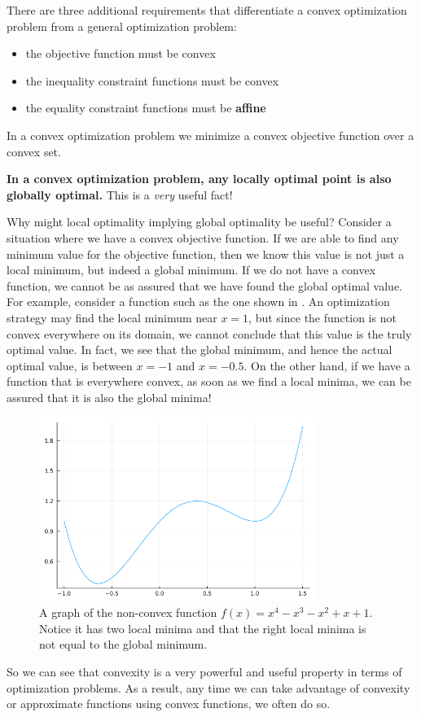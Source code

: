 There are three additional requirements that differentiate a convex optimization problem from a general optimization problem:
{\color{baystate}
	\begin{itemize}
		\item the objective function must be convex
		\item the inequality constraint functions must be convex
		\item the equality constraint functions must be {\color{tiananmen}\textbf{affine}}
	\end{itemize}
}

In a convex optimization problem we minimize a convex objective function over a convex set.

\textbf{In a convex optimization problem, any {\color{tiananmen}\textbf{locally optimal point}} is also {\color{tiananmen}\textbf{globally optimal}}.} This is a \textit{very} useful fact!

Why might local optimality implying global optimality be useful? Consider a situation where we have a convex objective function. If we are able to find any minimum value for the objective function, then we know this value is not just a local minimum, but indeed a global minimum. If we do not have a convex function, we cannot be as assured that we have found the global optimal value. For example, consider a function such as the one shown in . An optimization strategy may find the local minimum near $x=1$, but since the function is not convex everywhere on its domain, we cannot conclude that this value is the truly optimal value. In fact, we see that the global minimum, and hence the actual optimal value, is between $x=-1$ and $x=-0.5$. On the other hand, if we have a function that is everywhere convex, as soon as we find a local minima, we can be assured that it is also the global minima!

\begin{figure}
	\centering
	\includegraphics[width=0.8\textwidth]{Chapter_I_Background/Images/Non-Convex-Example.png}
	\caption[A Non-Convex Function]{A graph of the non-convex function $f(x)=x^4-x^3-x^2+x+1$. Notice it has two local minima and that the right local minima is not equal to the global minimum.}
	\label{fig:non-convex-function-example}
\end{figure}

So we can see that convexity is a very powerful and useful property in terms of optimization problems. As a result, any time we can take advantage of convexity or approximate functions using convex functions, we often do so.